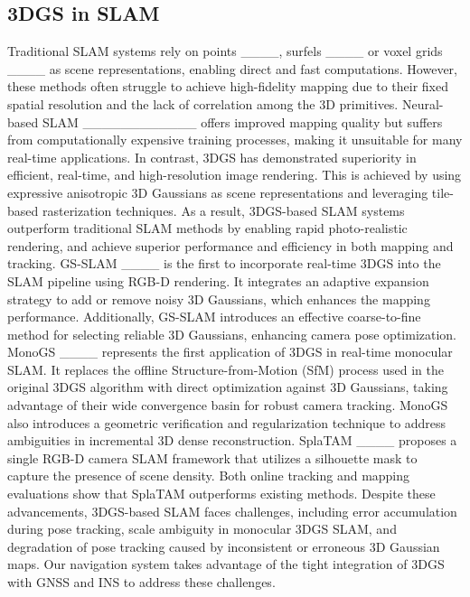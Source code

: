 \subsection{3DGS in SLAM}

Traditional SLAM systems rely on points ____, surfels ____ or voxel grids ____ as scene representations, enabling direct and fast computations. However, these methods often struggle to achieve high-fidelity mapping due to their fixed spatial resolution and the lack of correlation among the 3D primitives. Neural-based SLAM ____________ offers improved mapping quality but suffers from computationally expensive training processes, making it unsuitable for many real-time applications. In contrast, 3DGS has demonstrated superiority in efficient, real-time, and high-resolution image rendering. This is achieved by using expressive anisotropic 3D Gaussians as scene representations and leveraging tile-based rasterization techniques. As a result, 3DGS-based SLAM systems outperform traditional SLAM methods by enabling rapid photo-realistic rendering, and achieve superior performance and efficiency in both mapping and tracking. GS-SLAM ____ is the first to incorporate real-time 3DGS into the SLAM pipeline using RGB-D rendering. It integrates an adaptive expansion strategy to add or remove noisy 3D Gaussians, which enhances the mapping performance. Additionally, GS-SLAM introduces an effective coarse-to-fine method for selecting reliable 3D Gaussians, enhancing camera pose optimization. MonoGS ____ represents the first application of 3DGS in real-time monocular SLAM. It replaces the offline Structure-from-Motion (SfM) process used in the original 3DGS algorithm with direct optimization against 3D Gaussians, taking advantage of their wide convergence basin for robust camera tracking. MonoGS also introduces a geometric verification and regularization technique to address ambiguities in incremental 3D dense reconstruction. SplaTAM ____ proposes a single RGB-D camera SLAM framework that utilizes a silhouette mask to capture the presence of scene density. Both online tracking and mapping evaluations show that SplaTAM outperforms existing methods. Despite these advancements, 3DGS-based SLAM faces challenges, including error accumulation during pose tracking, scale ambiguity in monocular 3DGS SLAM, and degradation of pose tracking caused by inconsistent or erroneous 3D Gaussian maps. Our navigation system takes advantage of the tight integration of 3DGS with GNSS and INS to address these challenges.